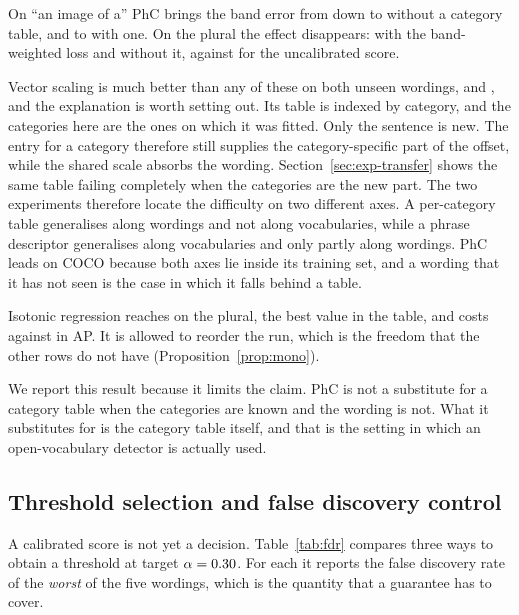 

On ``an image of a'' PhC brings the band error from \HELDID{} down to \HELDBAND{} without a
category table, and to \HELDPHC{} with one. On the plural the effect disappears: \HELDBANDPL{}
with the band-weighted loss and \HELDPLURAL{} without it, against \HELDPLURALID{} for the
uncalibrated score.

Vector scaling is much better than any of these on both unseen wordings, \HELDVECIMG{} and
\HELDVEC{}, and the explanation is worth setting out. Its table is indexed by category, and the
categories here are the ones on which it was fitted. Only the sentence is new. The entry for a
category therefore still supplies the category-specific part of the offset, while the shared
scale absorbs the wording. Section~\ref{sec:exp-transfer} shows the same table failing completely
when the categories are the new part. The two experiments therefore locate the difficulty on two
different axes. A per-category table generalises along wordings and not along vocabularies, while
a phrase descriptor generalises along vocabularies and only partly along wordings. PhC leads on
COCO because both axes lie inside its training set, and a wording that it has not seen is the
case in which it falls behind a table.

Isotonic regression reaches \HELDISO{} on the plural, the best value in the table, and costs
\HELDISOAP{} against \APID{} in AP. It is allowed to reorder the run, which is the freedom that
the other rows do not have (Proposition~\ref{prop:mono}).

We report this result because it limits the claim. PhC is not a substitute for a category table
when the categories are known and the wording is not. What it substitutes for is the category
table itself, and that is the setting in which an open-vocabulary detector is actually used.

\subsection{Threshold selection and false discovery control}\label{sec:exp-fdr}

A calibrated score is not yet a decision. Table~\ref{tab:fdr} compares three ways to obtain a
threshold at target $\alpha=0.30$. For each it reports the false discovery rate of the
\emph{worst} of the five wordings, which is the quantity that a guarantee has to cover.



